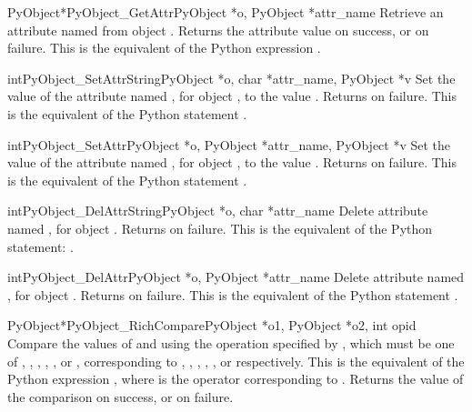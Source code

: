 \begin{cfuncdesc}{PyObject*}{PyObject_GetAttr}{PyObject *o,
                                               PyObject *attr_name}
  Retrieve an attribute named  from object .
  Returns the attribute value on success, or \NULL{} on failure.  This
  is the equivalent of the Python expression
  .
\end{cfuncdesc}


\begin{cfuncdesc}{int}{PyObject_SetAttrString}{PyObject *o,
                                               char *attr_name, PyObject *v}
  Set the value of the attribute named , for object
  , to the value . Returns  on failure.  This
  is the equivalent of the Python statement
  .
\end{cfuncdesc}


\begin{cfuncdesc}{int}{PyObject_SetAttr}{PyObject *o,
                                         PyObject *attr_name, PyObject *v}
  Set the value of the attribute named , for object
  , to the value . Returns  on failure.  This
  is the equivalent of the Python statement
  .
\end{cfuncdesc}


\begin{cfuncdesc}{int}{PyObject_DelAttrString}{PyObject *o, char *attr_name}
  Delete attribute named , for object . Returns
   on failure.  This is the equivalent of the Python
  statement: .
\end{cfuncdesc}


\begin{cfuncdesc}{int}{PyObject_DelAttr}{PyObject *o, PyObject *attr_name}
  Delete attribute named , for object . Returns
   on failure.  This is the equivalent of the Python
  statement .
\end{cfuncdesc}


\begin{cfuncdesc}{PyObject*}{PyObject_RichCompare}{PyObject *o1,
                                                   PyObject *o2, int opid}
  Compare the values of  and  using the operation
  specified by , which must be one of
  ,
  ,
  ,
  ,
  , or
  , corresponding to
  \code{<},
  \code{<=},
  \code{==},
  \code{!=},
  \code{>}, or
  \code{>=} respectively. This is the equivalent of the Python expression
  , where  is the operator
  corresponding to . Returns the value of the comparison on
  success, or \NULL{} on failure.
\end{cfuncdesc}

